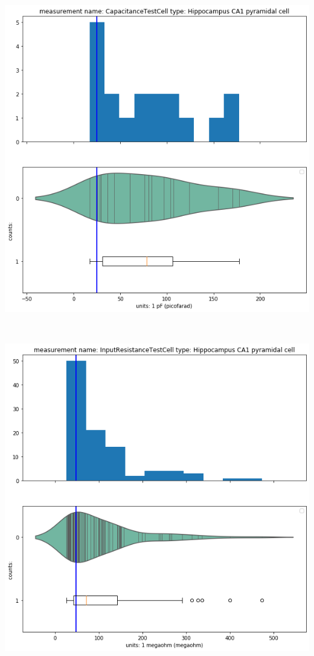     \begin{center}
    \includegraphics[width=0.7\linewidth]{notebooks_converted/needata_thesis_files/needata_thesis_5_27}
    \end{center}
    { \hspace*{\fill} \\}
    
    \begin{center}
    \includegraphics[width=0.7\linewidth]{notebooks_converted/needata_thesis_files/needata_thesis_5_28}
    \end{center}
    { \hspace*{\fill} \\}
    
